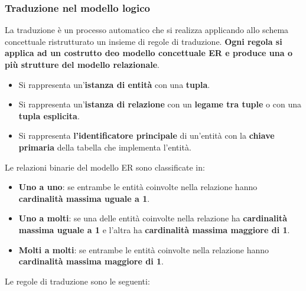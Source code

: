 \documentclass[a4paper,twoside]{article}
\begin{document}
\subsubsection{Traduzione nel modello logico}
La traduzione è un processo automatico che si realizza applicando allo schema concettuale
ristrutturato un insieme di regole di traduzione. \textbf{Ogni regola si applica ad un
costrutto deo modello concettuale ER e produce una o più strutture del modello relazionale}.
\begin{itemize}
  \item Si rappresenta un'\textbf{istanza di entità} con una \textbf{tupla}.

  \item Si rappresenta un'\textbf{istanza di relazione} con un \textbf{legame tra tuple}
    o con una \textbf{tupla esplicita}.

  \item Si rappresenta \textbf{l'identificatore principale} di un'entità con la
    \textbf{chiave primaria} della tabella che implementa l'entità.
\end{itemize}
Le relazioni binarie del modello ER sono classificate in:
\begin{itemize}
  \item \textbf{Uno a uno}: se entrambe le entità coinvolte nella relazione hanno
    \textbf{cardinalità massima uguale a 1}.

  \item \textbf{Uno a molti}: se una delle entità coinvolte nella relazione ha 
    \textbf{cardinalità massima uguale a 1} e l'altra ha \textbf{cardinalità massima
    maggiore di 1}.

  \item \textbf{Molti a molti}: se entrambe le entità coinvolte nella relazione hanno
    \textbf{cardinalità massima maggiore di 1}.
\end{itemize}
Le regole di traduzione sono le seguenti:
\end{document}
